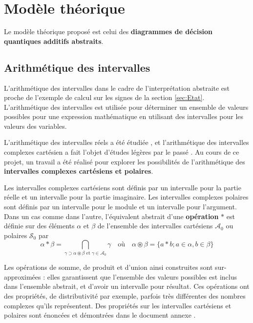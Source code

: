 \newpage

\chapter{Modèle théorique}
\label{ch:Modele}

Le modèle théorique proposé est celui des \textbf{diagrammes de décision quantiques additifs abstraits}.

\section{Arithmétique des intervalles}
\label{sec:ArithmetiqueIntervalles}

L'arithmétique des intervalles dans le cadre de l'interprétation abstraite est proche de l'exemple de calcul sur les signes de la section \ref{sec:Etat}. L'arithmétique des intervalles est utilisée pour déterminer un ensemble de valeurs possibles pour une expression mathématique en utilisant des intervalles pour les valeurs des variables.

L'arithmétique des intervalles réels a été étudiée \cite{Sunaga_2009}, et l'arithmétique des intervalles complexes cartésien a fait l'objet d'études légères par le passé \cite{Rokne_1971}. Au cours de ce projet, un travail a été réalisé pour explorer les possibilités de l'arithmétique des \textbf{intervalles complexes cartésiens et polaires}.

Les intervalles complexes cartésiens sont définis par un intervalle pour la partie réelle et un intervalle pour la partie imaginaire. Les intervalles complexes polaires sont définis par un intervalle pour le module et un intervalle pour l'argument. Dans un cas comme dans l'autre, l'équivalent abstrait d'une \textbf{opération} $*$ est définie sur des éléments $\alpha$ et $\beta$ de l'ensemble des intervalles cartésiens $\mathcal{A}_0$ ou polaires $\mathcal S_0$ par
$$\alpha * \beta = \bigcap_{\gamma \supset \alpha \circledast \beta\text{ et }\gamma \in \mathcal{A}_0} \gamma \quad \text{où} \quad \alpha \circledast \beta = \{a * b ; a \in \alpha, b \in \beta\}$$

Les opérations de somme, de produit et d'union ainsi construites sont sur-approximées : elles garantissent que l'ensemble des valeurs possibles est inclus dans l'ensemble abstrait, et d'avoir un intervalle pour résultat. Ces opérations ont des propriétés, de distributivité par exemple, parfois très différentes des nombres complexes qu'ils représentent. Des propriétés sur les intervalles cartésiens et polaires sont énoncées et démontrées dans le document annexe \cite{Leroy_2024}.

